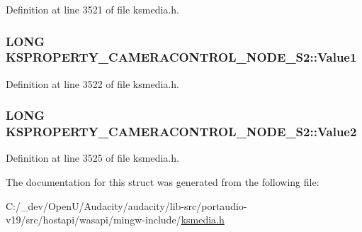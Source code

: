 Definition at line 3521 of file ksmedia.\+h.

\subsubsection[{\texorpdfstring{Value1}{Value1}}]{\setlength{\rightskip}{0pt plus 5cm}L\+O\+NG K\+S\+P\+R\+O\+P\+E\+R\+T\+Y\+\_\+\+C\+A\+M\+E\+R\+A\+C\+O\+N\+T\+R\+O\+L\+\_\+\+N\+O\+D\+E\+\_\+\+S2\+::\+Value1}\hypertarget{struct_k_s_p_r_o_p_e_r_t_y___c_a_m_e_r_a_c_o_n_t_r_o_l___n_o_d_e___s2_a2e88d6c7724beda97a802c97bc4480c4}{}\label{struct_k_s_p_r_o_p_e_r_t_y___c_a_m_e_r_a_c_o_n_t_r_o_l___n_o_d_e___s2_a2e88d6c7724beda97a802c97bc4480c4}


Definition at line 3522 of file ksmedia.\+h.

\subsubsection[{\texorpdfstring{Value2}{Value2}}]{\setlength{\rightskip}{0pt plus 5cm}L\+O\+NG K\+S\+P\+R\+O\+P\+E\+R\+T\+Y\+\_\+\+C\+A\+M\+E\+R\+A\+C\+O\+N\+T\+R\+O\+L\+\_\+\+N\+O\+D\+E\+\_\+\+S2\+::\+Value2}\hypertarget{struct_k_s_p_r_o_p_e_r_t_y___c_a_m_e_r_a_c_o_n_t_r_o_l___n_o_d_e___s2_a1e8b67d1bb471448346fcaee38d2d33f}{}\label{struct_k_s_p_r_o_p_e_r_t_y___c_a_m_e_r_a_c_o_n_t_r_o_l___n_o_d_e___s2_a1e8b67d1bb471448346fcaee38d2d33f}


Definition at line 3525 of file ksmedia.\+h.



The documentation for this struct was generated from the following file\+:\begin{DoxyCompactItemize}
\item 
C\+:/\+\_\+dev/\+Open\+U/\+Audacity/audacity/lib-\/src/portaudio-\/v19/src/hostapi/wasapi/mingw-\/include/\hyperlink{ksmedia_8h}{ksmedia.\+h}\end{DoxyCompactItemize}
